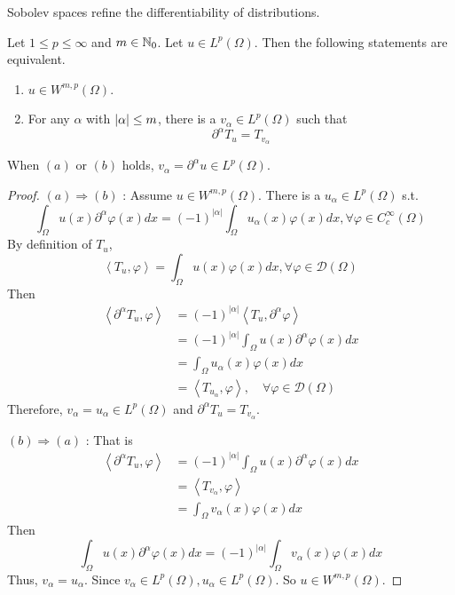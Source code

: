\noindent Sobolev spaces refine the differentiability of distributions.
\begin{prop}
	Let $1 \leq p \leq \infty$ and $m \in \mathbb{N}_0$. Let $u \in L^p(\Omega)$. Then the following statements are equivalent.
	\begin{enumerate}[label=(\alph{*})]
		\item $u \in W^{m,p}(\Omega)$.
		\item For any $\alpha$ with $\left\lvert\alpha\right\lvert \leq m$, there is a $v_{\alpha} \in L^p(\Omega)$ such that
		\begin{equation*}
			\partial^\alpha T_u=T_{v_\alpha}
		\end{equation*}
	\end{enumerate}
\end{prop}
\begin{rmk}
	When $(a)$ or $(b)$ holds, $v_\alpha = \partial^\alpha u \in L^p(\Omega)$.
\end{rmk}
\begin{proof}
	\noindent $(a) \Rightarrow(b)$ : Assume $u \in W^{m, p}(\Omega)$. There is a $u_\alpha \in L^p(\Omega)$ s.t.
	$$
	\int_{\Omega} u(x) \partial^\alpha \varphi(x) d x=(-1)^{|\alpha|} \int_{\Omega} u_\alpha(x) \varphi(x) d x, \forall \varphi \in C_c^{\infty}(\Omega)
	$$
	By definition of $T_u$,
	$$
	\left\langle T_u, \varphi\right\rangle=\int_{\Omega} u(x) \varphi(x) d x, \forall \varphi \in \mathcal{D}(\Omega)
	$$
	Then
	$$
	\begin{aligned}
	\left\langle\partial^\alpha T_u, \varphi\right\rangle & =(-1)^{|\alpha|}\left\langle T_u, \partial^\alpha \varphi\right\rangle \\
	& =(-1)^{|\alpha|} \int_{\Omega} u(x) \partial^\alpha \varphi(x) d x \\
	& =\int_{\Omega} u_\alpha(x) \varphi(x) d x \\
	& =\left\langle T_{u_\alpha}, \varphi\right\rangle, \quad \forall \varphi \in \mathcal{D}(\Omega)
	\end{aligned}
	$$
	Therefore, $v_\alpha=u_\alpha \in L^p(\Omega)$ and $\partial^\alpha T_u=T_{v_\alpha}$.

	\noindent $(b) \Rightarrow(a)$ : That is
	$$
	\begin{aligned}
	\left\langle\partial^\alpha T_u, \varphi\right\rangle & =(-1)^{|\alpha|} \int_{\Omega} u(x) \partial^\alpha \varphi(x) d x \\
	& =\left\langle T_{v_\alpha}, \varphi\right\rangle \\
	& =\int_{\Omega} v_\alpha(x) \varphi(x) d x
	\end{aligned}
	$$
	Then
	$$
	\int_{\Omega} u(x) \partial^\alpha \varphi(x) d x=(-1)^{|\alpha|} \int_{\Omega} v_\alpha(x) \varphi(x) d x
	$$
	Thus, $v_\alpha=u_\alpha$. Since $v_\alpha \in L^p(\Omega), u_\alpha \in L^p(\Omega)$. So $u \in W^{m, p}(\Omega)$.
\end{proof}

